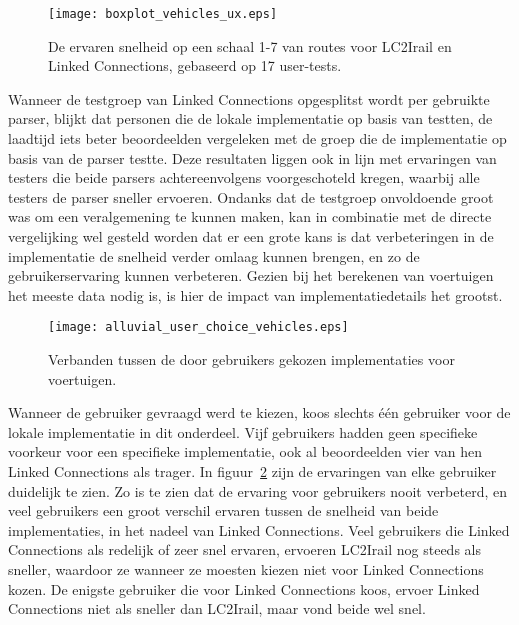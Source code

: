 \begin{figure}[h]
	\centering
	\texttt{[image: boxplot\_vehicles\_ux.eps]}
	\caption[Ervaren snelheid van routes]{De ervaren snelheid op een schaal 1-7 van routes voor LC2Irail en Linked Connections, gebaseerd op 17 user-tests.}
	\label{fig:vehiclesUx}
\end{figure}

Wanneer de testgroep van Linked Connections opgesplitst wordt per gebruikte parser, blijkt dat personen die de lokale implementatie op basis van  testten, de laadtijd iets beter beoordeelden vergeleken met de groep die de implementatie op basis van de  parser testte. Deze resultaten liggen ook in lijn met ervaringen van testers die beide parsers achtereenvolgens voorgeschoteld kregen, waarbij alle testers de  parser sneller ervoeren. Ondanks dat de testgroep onvoldoende groot was om een veralgemening te kunnen maken, kan in combinatie met de directe vergelijking wel gesteld worden dat er een grote kans is dat verbeteringen in de implementatie de snelheid verder omlaag kunnen brengen, en zo de gebruikerservaring kunnen verbeteren. Gezien bij het berekenen van voertuigen het meeste data nodig is, is hier de impact van implementatiedetails het grootst.

\begin{figure}[ht]
	\centering
	\texttt{[image: alluvial\_user\_choice\_vehicles.eps]}
	\caption[Door gebruikers gekozen implementatie voor voertuigen]{Verbanden tussen de door gebruikers gekozen implementaties voor voertuigen. }
	\label{fig:alluvialUserChoicesVehicles}
\end{figure}

Wanneer de gebruiker gevraagd werd te kiezen, koos slechts één gebruiker voor de lokale implementatie in dit onderdeel. Vijf gebruikers hadden geen specifieke voorkeur voor een specifieke implementatie, ook al beoordeelden vier van hen Linked Connections als trager. In figuur~\ref{fig:alluvialUserChoicesVehicles} zijn de ervaringen van elke gebruiker duidelijk te zien. Zo is te zien dat de ervaring voor gebruikers nooit verbeterd, en veel gebruikers een groot verschil ervaren tussen de snelheid van beide implementaties, in het nadeel van Linked Connections. Veel gebruikers die Linked Connections als redelijk of zeer snel ervaren, ervoeren LC2Irail nog steeds als sneller, waardoor ze wanneer ze moesten kiezen niet voor Linked Connections kozen. De enigste gebruiker die voor Linked Connections koos, ervoer Linked Connections niet als sneller dan LC2Irail, maar vond beide wel snel.

